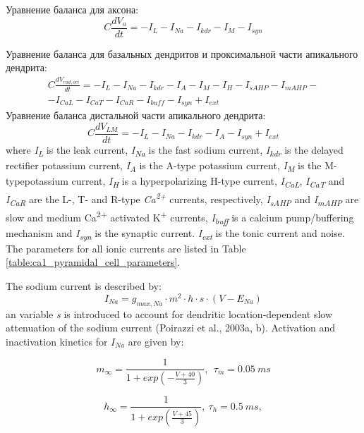 \documentclass[a4paper,12pt]{article}
\begin{document}
Уравнение баланса для аксона:
\begin{equation}
C\frac{dV_a}{dt}=-I_L-I_{Na}-I_{kdr}-I_M-I_{syn}
\end{equation}

Уравнение баланса для базальных дендритов и проксимальной части апикального дендрита:
\begin{eqnarray}
C\frac{dV_{rad,ori}}{dt} =-I_L-I_{Na}-I_{kdr}-I_A-I_M-I_H-I_{sAHP}-I_{mAHP}- \nonumber \\-I_{CaL}-I_{CaT}-I_{CaR}-I_{buff}-I_{syn}+I_{ext}
\end{eqnarray}
Уравнение баланса дистальной части апикального дендрита:
\begin{equation}
C\frac{dV_{LM}}{dt}=-I_L-I_{Na}-I_{kdr}-I_A-I_{syn}+I_{ext}
\end{equation}
where \textit{I\textsubscript{L}} is the leak current,  \textit{I\textsubscript{Na}} is the fast sodium current, \textit{I\textsubscript{kdr}} is the delayed rectifier potassium current, \textit{I\textsubscript{A}} is the A-type potassium current, \textit{I\textsubscript{M}}
is the M-typepotassium current, \textit{I\textsubscript{H}} is a hyperpolarizing H-type current,
\textit{I\textsubscript{CaL}}, \textit{I\textsubscript{CaT}} and
\textit{I\textsubscript{CaR}} are the L-, T- and R-type \textit{Ca\textsuperscript{2+}} currents, respectively,
\textit{I\textsubscript{sAHP}} and \textit{I\textsubscript{mAHP}} are
slow and medium Ca\textsuperscript{2+} activated K\textsuperscript{+} currents,\textit{ I\textsubscript{buff}}
is a calcium pump/buffering mechanism and \textit{I\textsubscript{syn}} is the synaptic current. \textit{ I\textsubscript{ext}} is the tonic current and noise. The
parameters for all ionic currents are listed in Table \ref{table:ca1_pyramidal_cell_parameters}. \par
The sodium current is described by:
\begin{equation}
I_{Na}= g_{max, Na}\cdot m^2\cdot h\cdot s\cdot (V-E_{Na})
\end{equation}
an variable \textit{s} is introduced to account for dendritic location‑dependent slow attenuation of the sodium current (Poirazzi et al., 2003a, b). Activation and inactivation kinetics for ${I_{Na}}$ are given by:

\begin{equation}
m_{\infty}=\frac {1}{1+exp(-\frac{V+40} {3})} , \ \ \tau_m=0.05 \ ms
\end{equation}

\begin{equation}
h_{\infty}=\frac {1}{1+exp(\frac{V+45}{3})},  \  \tau_h = 0.5 \ ms,
\end{equation}
\end{document}
